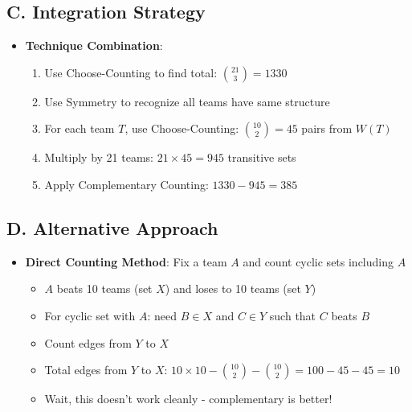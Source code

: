 \documentclass[]{article}
\begin{document}
\begin{techniquesbox}
\subsection*{C. Integration Strategy}
\begin{itemize}[leftmargin=*]
    \item \textbf{Technique Combination}:
    \begin{enumerate}
        \item Use Choose-Counting to find total: $\binom{21}{3} = 1330$
        \item Use Symmetry to recognize all teams have same structure
        \item For each team $T$, use Choose-Counting: $\binom{10}{2} = 45$ pairs from $W(T)$
        \item Multiply by 21 teams: $21 \times 45 = 945$ transitive sets
        \item Apply Complementary Counting: $1330 - 945 = 385$
    \end{enumerate}
\end{itemize}

\subsection*{D. Alternative Approach}
\begin{itemize}[leftmargin=*]
    \item \textbf{Direct Counting Method}: Fix a team $A$ and count cyclic sets including $A$
    \begin{itemize}
        \item $A$ beats 10 teams (set $X$) and loses to 10 teams (set $Y$)
        \item For cyclic set with $A$: need $B \in X$ and $C \in Y$ such that $C$ beats $B$
        \item Count edges from $Y$ to $X$
        \item Total edges from $Y$ to $X$: $10 \times 10 - \binom{10}{2} - \binom{10}{2} = 100 - 45 - 45 = 10$
        \item Wait, this doesn't work cleanly - complementary is better!
    \end{itemize}
\end{itemize}
\end{techniquesbox}
\end{document}
